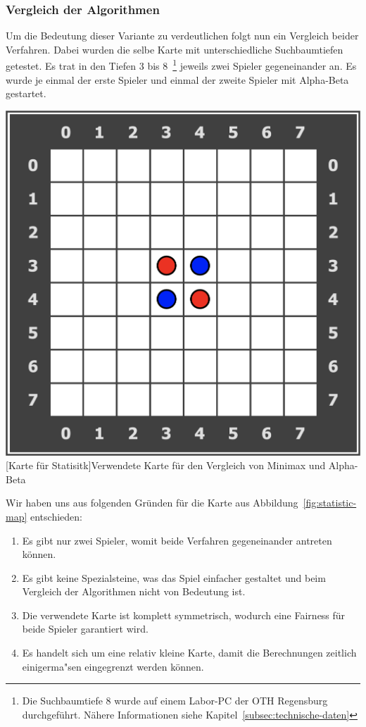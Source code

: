 \subsubsection{Vergleich der Algorithmen}\label{subsubsec:vergleich-von-algorithmen}
Um die Bedeutung dieser Variante zu verdeutlichen folgt nun ein Vergleich beider Verfahren.
Dabei wurden die selbe Karte mit unterschiedliche Suchbaumtiefen getestet.
Es trat in den Tiefen 3 bis 8~\footnote{Die Suchbaumtiefe 8 wurde auf einem Labor-PC der OTH Regensburg durchgef\"uhrt. N\"ahere Informationen siehe Kapitel~\ref{subsec:technische-daten}} jeweils zwei Spieler gegeneinander an.
Es wurde je einmal der erste Spieler und einmal der zweite Spieler mit Alpha-Beta gestartet.

\vspace{1em}
\begin{minipage}{\linewidth}
    \centering
    \includegraphics[width=0.3\linewidth]{pics/statistic-map}
    [Karte für Statisitk]{Verwendete Karte für den Vergleich von Minimax und Alpha-Beta}
    \label{fig:statistic-map}
\end{minipage}
\vspace{1em}

Wir haben uns aus folgenden Gr\"unden f\"ur die Karte aus Abbildung~\ref{fig:statistic-map} entschieden:
\begin{enumerate}
    \item Es gibt nur zwei Spieler, womit beide Verfahren gegeneinander antreten k\"onnen.
    \item Es gibt keine Spezialsteine, was das Spiel einfacher gestaltet und beim Vergleich der Algorithmen nicht von Bedeutung ist.
    \item Die verwendete Karte ist komplett symmetrisch, wodurch eine Fairness f\"ur beide Spieler garantiert wird.
    \item Es handelt sich um eine relativ kleine Karte, damit die Berechnungen zeitlich einigerma"sen eingegrenzt werden k\"onnen.
\end{enumerate}

